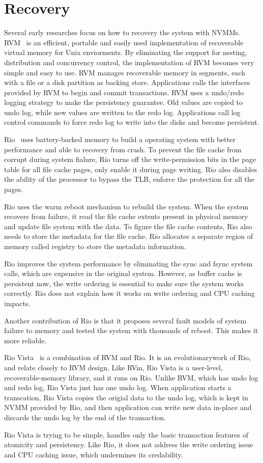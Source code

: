 \section{Recovery} 
\label{sec:recovery}

Several early researches focus on how to recovery the system with NVMMs.
RVM~\cite{rvm} is an efficient, portable and easily used implementation of
recoverable virtual memory for Unix enviorments. By eliminating the support
for nesting, distribution and concurrency control, the implementation of 
RVM becomes very simple and easy to use. RVM manages recoverable memory in
segments, each with a file or a disk partition as backing store. Applications
calls the interfaces provided by RVM to begin and commit transactions. RVM
uses a undo/redo logging strategy to make the persistency guarantee. Old values
are copied to undo log, while new values are written to the redo log. Applications call log control commands to force redo log to write into the disks
and become persistent.

Rio~\cite{riofilecache} uses battery-backed memory to build a operating system
with better performance and able to recovery from crash. To prevent the file
cache from corrupt during system fialure, Rio turns off the write-permission
bits in the page table for all file cache pages, only enable it during page
writing. Rio also disables the ability of the processor to bypass the TLB,
enforce the protection for all the pages.

Rio uses the warm reboot mechanism to rebuild the system. When the system 
recovers from failure, it read the file cache extents present in physical memory
and update file system with the data. To figure the file cache contents,
Rio also needs to store the metadata for the file cache. Rio allocates a
separate region of memory called registry to store the metadata information.

Rio improves the system performance by eliminating the sync and fsync system
calls, which are expensive in the original system. However, as buffer cache
is persistent now, the write ordering is essential to make sure the system
works correctly. Rio does not explain how it works on write ordering and CPU
caching impacts.

Another contribution of Rio is that it proposes several fault models of system
failure to memory and tested the system with thousands of reboot. This makes
it more reliable.
 
Rio Vista~\cite{riovista} is a combination of RVM and Rio. It is an evolutionarywork of Rio, and relate closely to RVM design. Like RVm, Rio Vista is a
user-level, recoverable-memory library, and it runs on Rio. Unlike RVM,
which has undo log and redo log, Rio Vista just has one undo log. When
application starts a transcation, Rio Vista copies the origial data to the 
undo log, which is kept in NVMM provided by Rio, and then application can
write new data in-place and discards the undo log by the end of the transaction.

Rio Vista is trying to be simple, handles only the basic transaction features
of atomicity and persistency. Like Rio, it does not address the write ordering
issue and CPU caching issue, which undermines its credability. 

